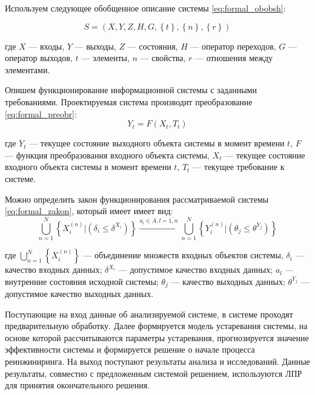Используем следующее обобщенное описание системы \ref{eq:formal_obobsh}: 

\begin{equation}
    \label{eq:formal_obobsh}
    S=(X,Y,Z,H,G, \left\{ t \right\}, \left\{ n \right\}, \left\{ r \right\} )
\end{equation}

\noindent
где $X$ --- входы,
$Y$ --- выходы,
$Z$ --- состояния,
$H$ --- оператор переходов,
$G$ --- оператор выходов,
$t$ --- элементы,
$n$ --- свойства,
$r$ --- отношения между элементами.

Опишем функционирование информационной системы с заданными требованиями. 
Проектируемая система производит преобразование \ref{eq:formal_preobr}:
\begin{equation}
    \label{eq:formal_preobr}
    Y_t=F(X_t,T_t)
\end{equation} 

\noindent
где $Y_t$ --- текущее состояние выходного объекта системы в момент времени $t$,
$F$ --- функция преобразования входного объекта системы,
$X_t$ --- текущее состояние входного объекта системы в момент времени $t$,
$T_t$ --- текущее требование к системе.

Можно определить закон функционирования рассматриваемой системы \ref{eq:formal_zakon}, который имеет имеет вид: 
\begin{equation}
    \label{eq:formal_preobr}
    \bigcup_{n=1}^N \left\{ X_i^{(n)} | (\delta_i \leq \delta^{X_i}) \right\}
    \xrightarrow{a_i \in A, l=\overline{1,n}}
    \bigcup_{n=1}^N \left\{ Y_i^{(n)} | (\theta_j \leq \theta^{Y_j}) \right\}
\end{equation} 

\noindent
где $\bigcup_{n=1}^N \left\{ X_i^{(n)} \right\}$ --- объединение множеств входных объектов системы,
$\delta_i$ --- качество входных данных;
$\delta^{X_i}$ --- допустимое качество входных данных; 
$a_l$ --- внутренние состояния исходной системы; 
$\theta_j$ --- качество выходных данных;
$\theta^{Y_j}$ --- допустимое качество выходных данных. 

Поступающие на вход данные об анализируемой системе, в системе проходят предварительную обработку. 
Далее формируется модель устаревания системы, на основе которой рассчитываются параметры устаревания, прогнозируется значение эффективности системы и формируется решение о начале процесса реинжиниринга. 
На выход поступают результаты анализа и исследований. 
Данные результаты, совместно с предложенным системой решением, используются ЛПР для принятия окончательного решения.

